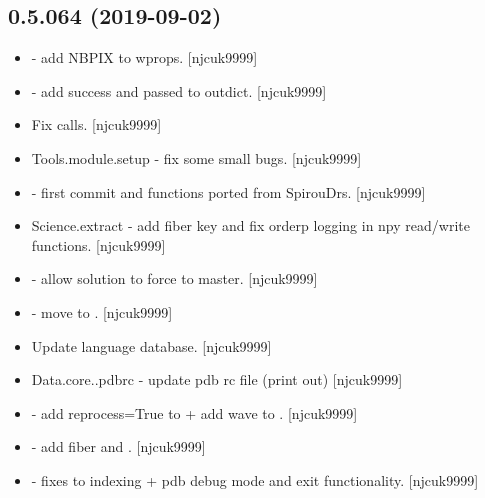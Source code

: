 \documentclass[a4paper,10pt,english]{report}
\begin{document}
\subsection{0.5.064 (2019-09-02)}
\label{\detokenize{misc/changelog:id78}}\begin{itemize}
\item {} 
 - add NBPIX to wprops. {[}njcuk9999{]}

\item {} 
 - add success and passed to outdict.
{[}njcuk9999{]}

\item {} 
Fix  calls. {[}njcuk9999{]}

\item {} 
Tools.module.setup - fix some small bugs. {[}njcuk9999{]}

\item {} 
 - first commit and functions ported from SpirouDrs.
{[}njcuk9999{]}

\item {} 
Science.extract - add fiber key and fix orderp logging in npy
read/write functions. {[}njcuk9999{]}

\item {} 
 - allow  solution to force to
master. {[}njcuk9999{]}

\item {} 
 - move  to .
{[}njcuk9999{]}

\item {} 
Update language database. {[}njcuk9999{]}

\item {} 
Data.core..pdbrc - update pdb rc file (print out) {[}njcuk9999{]}

\item {} 
 - add reprocess=True to  + add
wave to . {[}njcuk9999{]}

\item {} 
 - add fiber and .
{[}njcuk9999{]}

\item {} 
 - fixes to indexing + pdb debug mode and exit
functionality. {[}njcuk9999{]}


\end{itemize}
\end{document}

